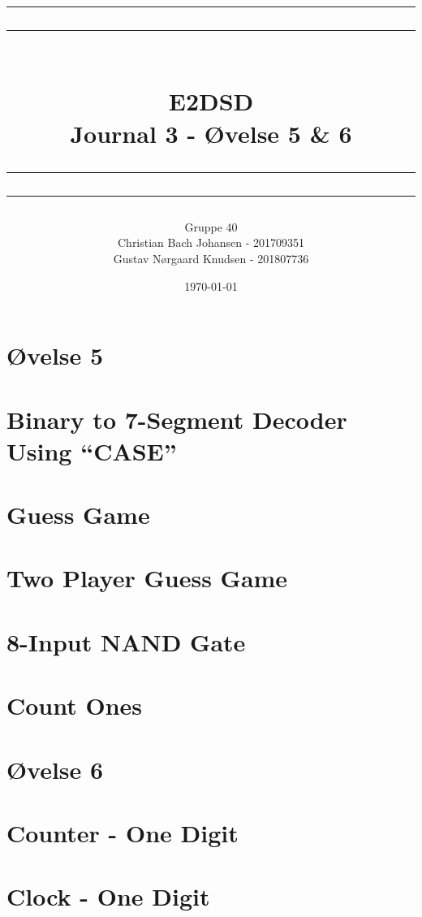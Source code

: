 \documentclass[12pt,a4paper]{article}
\newcommand\mymaketitle[1]{
   \rule{\textwidth}{1.6pt}\vspace*{-\baselineskip}\vspace*{2pt}
   \rule{\textwidth}{0.4pt}
   \\  
   \huge \bf #1\\
   \vspace{-8pt}
   \rule{\textwidth}{0.4pt}\vspace*{-\baselineskip}\vspace{3.2pt}
   \rule{\textwidth}{1.6pt}
}
\begin{document}
\title{
	\mymaketitle{E2DSD\\Journal 3 - Øvelse 5 & 6}
}
\author{
	Gruppe 40\\
	Christian Bach Johansen - 201709351\\
	Gustav Nørgaard Knudsen - 201807736
}
\date{\today}

\maketitle

\section*{Øvelse 5}

\section{Binary to 7-Segment Decoder Using “CASE”}


\section{Guess Game}


\section{Two Player Guess Game}


\section{8-Input NAND Gate}


\section{Count Ones}


\section*{Øvelse 6}

\section{Counter - One Digit}


\section{Clock - One Digit}

\end{document}

